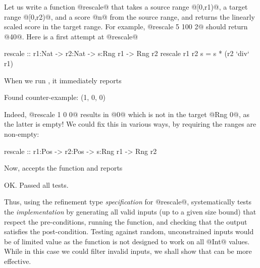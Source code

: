 Let us write a function @rescale@ that takes a source range @[0,r1)@, 
a target range @[0,r2)@, and a score @n@ from the source range,
and returns the linearly scaled score in the target range.
%
For example, @rescale 5 100 2@ should return @40@. 
Here is a first attempt at @rescale@ 
%
\begin{code}
  rescale :: r1:Nat -> r2:Nat -> s:Rng r1 -> Rng r2 
  rescale r1 r2 s = s * (r2 `div` r1)   
\end{code}
%
When we run \toolname, it immediately reports 
%
\begin{code}
  Found counter-example: (1, 0, 0) 
\end{code}
%
Indeed, @rescale 1 0 0@ results in @0@ which is not in the target 
@Rng 0@, as the latter is empty! We could fix this in various ways, 
\eg by requiring the ranges are non-empty:
%
\begin{code}
  rescale :: r1:Pos -> r2:Pos -> s:Rng r1 -> Rng r2 
\end{code}
%
Now, \toolname accepts the function and reports
%
\begin{code}
  OK. Passed all tests.
\end{code}
%
Thus, using the refinement type \emph{specification} for @rescale@, 
\toolname systematically tests the \emph{implementation} by generating 
all valid inputs (up to a given size bound) that respect the 
pre-conditions, running the function, and checking that the 
output satisfies the post-condition.
%
Testing against random, unconstrained inputs would be of limited value 
as the function is not designed to work on all @Int@ values. While in 
this case we could filter invalid inputs, we shall show
that \toolname can be more effective.

